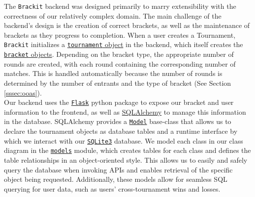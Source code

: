\documentclass{article}
\begin{document}
    The \texttt{Brackit} backend was designed primarily to marry extensibility with the correctness of 
our relatively complex domain. The main challenge of the backend's design is the creation of 
correct brackets, as well as the maintenance of brackets as they progress to completion.
When a user creates a Tournament, \texttt{Brackit} initializes a \href{https://github.com/alextrosta/brackit/blob/master/backend/tournament.py#L18}{\texttt{tournament} object} in the backend, which itself creates
the \href{https://github.com/alextrosta/brackit/blob/master/backend/tournament.py#L59}{\texttt{bracket} objects}. Depending on the bracket type, the appropriate number of rounds are created, 
with each round containing the corresponding number of matches. This is handled automatically because
the number of rounds is determined by the number of entrants and the type of bracket (See Section \ref{sssec:ooas}).\\
Our backend uses the \href{https://flask.palletsprojects.com/en/1.1.x/}{\texttt{Flask}} python package to expose our bracket and user information to 
the frontend, as well as \href{https://www.sqlalchemy.org/}{SQLAlchemy} to manage this information in the database. SQLAlchemy provides a \href{https://flask-sqlalchemy.palletsprojects.com/en/2.x/models/}{\texttt{Model}} base-class that allows us to declare the tournament objects as database tables and a runtime interface by which we interact with our \href{https://www.sqlite.org/index.html}{\texttt{SQLite3}} database. We model each class in our class diagram in the \href{https://github.com/alextrosta/brackit/blob/master/backend/app/models.py}{\texttt{models}} module, which creates 
tables for each class and defines the table relationships in an object-oriented style. This 
allows us to easily and safely query the database when invoking APIs and enables 
retrieval of the specific object being requested. Additionally, these models allow for 
seamless SQL querying for user data, such as users' cross-tournament wins and losses. 
\end{document}
